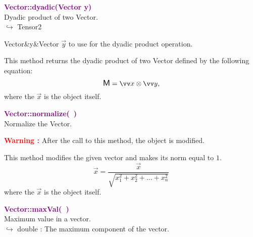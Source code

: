 \textcolor{purple}{\textbf{Vector::dyadic(Vector y)}}\label{Vector::dyadic(Vector y)}\\
Dyadic product of two Vector.\\ \hspace*{10mm}$\hookrightarrow$ Tensor2

\begin{tcolorbox}[width=\textwidth,myArgs,tabularx={ll|R}]
Vector&y&Vector $\overrightarrow{y}$ to use for the dyadic product operation.
\end{tcolorbox}

This method returns the dyadic product of two Vector defined by the following equation:
\begin{equation*}
\M = \overrightarrow{x}\otimes\overrightarrow{y},
\end{equation*}
where the $\overrightarrow{x}$ is the object itself.

\textcolor{purple}{\textbf{Vector::normalize(~)}}\label{Vector::normalize()}\\
Normalize the Vector.

\hspace*{10mm}\textcolor{red}{\textbf{Warning :}} After the call to this method, the object is modified.

This method modifies the given vector and makes its norm equal to $1$.
\begin{equation*}
\overrightarrow{x} = \frac{\overrightarrow{x}}{\sqrt {x_{1}^2 + x_{2}^2 + ... + x_{n}^2}}
\end{equation*}
where the $\overrightarrow{x}$ is the object itself.

\textcolor{purple}{\textbf{Vector::maxVal(~)}}\label{Vector::maxVal()}\\
Maximum value in a vector.\\ \hspace*{10mm}$\hookrightarrow$ double : The maximum component of the vector.

